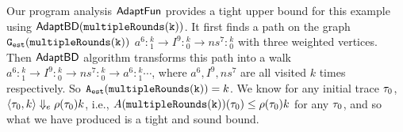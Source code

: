 {
Our program analysis {$\textsf{AdaptFun}$} provides a tight upper bound for this example using $\mathsf{AdaptBD}(\mathtt{multipleRounds(k)})$.
It first finds a path on the graph $\mathtt{{G_{est}}}(\mathtt{multipleRounds(k)})$
$a^{6}: {}^k_1 \to I^9:{}^k_0 \to ns^7:{}^k_0$ with three weighted vertices. 
Then $\mathsf{AdaptBD}$ algorithm transforms this path into a walk $a^{6}: {}^k_1 \to I^9:{}^k_0 \to ns^7:{}^k_0 \to a^{6}: {}^k_1 \cdots$, where $a^6, I^9, ns^{7}$ are all visited $k$ times respectively. 
So ${\mathtt{A_{est}}}(\mathtt{multipleRounds(k)}) = k$.
We know for any initial trace $\mathtt{\tau}_0$, $\langle \mathtt{\tau}_0, k \rangle \Downarrow_e \rho(\mathtt{\tau}_0)k$, i.e., $A(\mathtt{multipleRounds(k)})(\mathtt{\tau}_0) \leq \rho(\mathtt{\tau}_0)k$ for any $\mathtt{\tau}_0$, 
and so what we have produced is a tight and sound bound.
}
%
